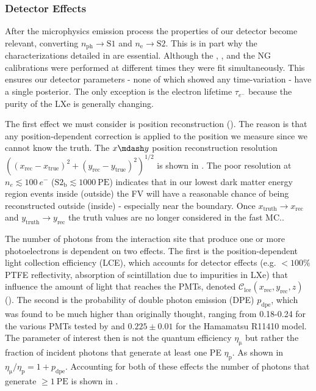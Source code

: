 \subsubsection{Detector Effects}
\label{subsubsec:er_nr_calibrations_parameter_determ_det_phys}
After the microphysics emission process the properties of our detector  become relevant, converting
$n_{\mathrm{ph}} \rightarrow \mathrm{S1}$ and $n_{\mathrm{e}} \rightarrow \mathrm{S2}$.  This is in part why the
characterizations detailed in  are essential.  Although the , , and the NG calibrations
were performed at different times they were fit simultaneously.  This ensures our detector parameters - none of which showed any
time-variation - have a single posterior.  The only exception is the electron lifetime $\tau_{e^-}$ because the purity of the LXe is generally
changing.

The first effect we must consider is position reconstruction ().  The reason is that
any position-dependent correction is applied to the position we measure since we cannot know the truth.  The $x \mdash y$ position
reconstruction resolution $((x_{\mathrm{rec}} - x_{\mathrm{true}})^2 + (y_{\mathrm{rec}} - y_{\mathrm{true}})^2)^{1/2}$ is shown in
.  The poor resolution at
$n_e \lesssim 100\ e^-$ ($\mathrm{S2_b} \lesssim 1000\ \mathrm{PE}$) indicates that in our lowest dark matter energy region events inside
(outside) the FV will have a reasonable chance of being reconstructed outside (inside) - especially near the boundary.  Once
$x_{\mathrm{truth}} \rightarrow x_{\mathrm{rec}}$ and
$y_{\mathrm{truth}} \rightarrow y_{\mathrm{rec}}$ the truth values are no longer considered in the fast MC..


The number of photons from the interaction site that produce one or more photoelectrons is dependent on two effects.  The first is
the position-dependent light collection efficiency (LCE), which accounts for detector effects (e.g. $<100\%$ PTFE reflectivity,
absorption of
scintillation due to impurities in LXe) that influence the amount of light that reaches the PMTs, denoted
$\mathcal{C}_{\mathrm{lce}}(x_{\mathrm{rec}}, y_{\mathrm{rec}}, z)$
().  The second is the probability of double photon emission (DPE) $p_{\mathrm{dpe}}$, which was found
to be much higher than originally thought, ranging from 0.18-0.24 for the various PMTs tested by  and $0.225 \pm 0.01$
for the Hamamatsu R11410 model.  The parameter of interest then is not the quantum efficiency $\eta_{\mathrm{\mu}}$ but rather the
fraction of incident photons that generate at least one PE $\eta_{\mathrm{p}}$.  As shown in 
$\eta_{\mathrm{\mu}} / \eta_{\mathrm{p}} = 1 + p_{\mathrm{dpe}}$.  Accounting for both of these effects the number of photons that
generate $\geq 1\ \mathrm{PE}$ is shown in .


